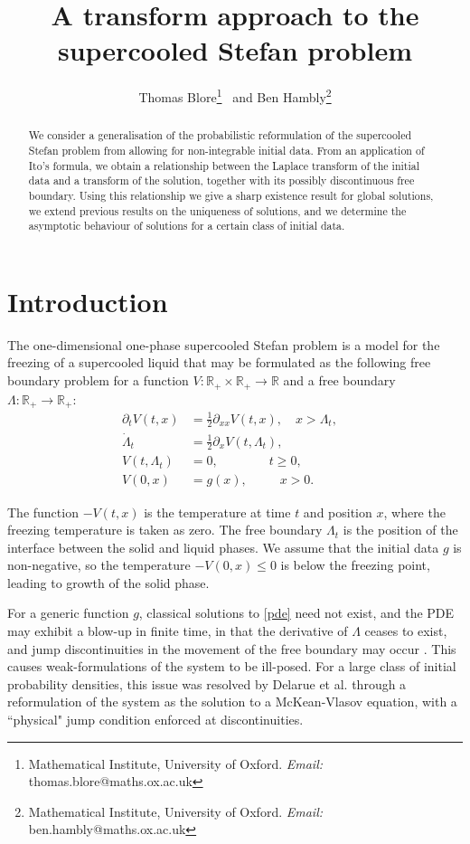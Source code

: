 \documentclass[11pt]{article}
\title{A transform approach to the supercooled Stefan problem}
\author{Thomas Blore\thanks{Mathematical Institute, University of Oxford. \textit{Email:} thomas.blore@maths.ox.ac.uk } \, and Ben Hambly\thanks{Mathematical Institute, University of Oxford. \textit{Email:} ben.hambly@maths.ox.ac.uk }}
\theoremstyle{plain}
\theoremstyle{remark}
\theoremstyle{definition}
\numberwithin{equation}{section}
\begin{document}
\maketitle
\begin{abstract}
We consider a generalisation of the probabilistic reformulation of the supercooled Stefan problem from \cite{3} allowing for non-integrable initial data. From an application of Ito's formula, we obtain a relationship between the Laplace transform of the initial data and a transform of the solution, together with its possibly discontinuous free boundary. 
Using this relationship we give a sharp existence result for global solutions, we extend previous results on the uniqueness of solutions, and we determine the asymptotic behaviour of solutions for a certain class of initial data.
\end{abstract}

\section{Introduction}
The one-dimensional one-phase supercooled Stefan problem is a model for the freezing of a supercooled liquid that may be formulated as the following free boundary problem for a function $V:\mathbb{R}_+\times\mathbb{R}_+\to \mathbb{R}$ and a free boundary $\Lambda:\mathbb{R}_+\to\mathbb{R}_+$:
\begin{align}
    \partial_t V(t,x) &=\frac{1}{2}\partial_{xx} V(t,x), \quad x>\Lambda_t,\nonumber\\
     \dot{\Lambda}_t &=\frac{1}{2}\partial_x V(t,\Lambda_t),\label{pde}\\
    V(t,\Lambda_t) &=0, \qquad\qquad t\geq 0, &\nonumber\\
    V(0,x) &=g(x),\qquad\;\; x>0.\nonumber
\end{align}

The function $-V(t,x)$ is the temperature at time $t$ and position $x$, where the freezing temperature is taken as zero. The free boundary $\Lambda_t$ is the position of the interface between the solid and liquid phases. We assume that the initial data $g$ is non-negative, so the temperature $-V(0,x)\leq 0$ is below the freezing point, leading to growth of the solid phase. 

For a generic function $g$, classical solutions to \eqref{pde} need not exist, and the PDE may exhibit a blow-up in finite time, in that the derivative of $\Lambda$ ceases to exist, and jump discontinuities in the movement of the free boundary may occur \cite{2}. This causes weak-formulations of the system to be ill-posed. For a large class of initial probability densities, this issue was resolved by Delarue et al. \cite{3} through a reformulation of the system as the solution to a McKean-Vlasov equation, with a ``physical" jump condition enforced at discontinuities.
\end{document}
